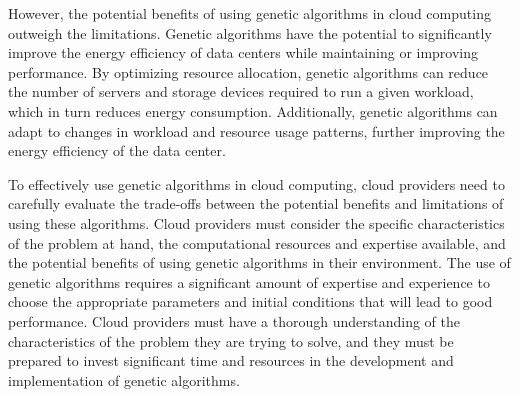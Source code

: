 However, the potential benefits of using genetic algorithms in cloud computing outweigh the limitations. 
Genetic algorithms have the potential to significantly improve the energy efficiency of data centers while maintaining or improving performance. 
By optimizing resource allocation, genetic algorithms can reduce the number of servers and storage devices required to run a given workload, 
which in turn reduces energy consumption. Additionally, genetic algorithms can adapt to changes in workload and resource usage patterns, 
further improving the energy efficiency of the data center.

To effectively use genetic algorithms in cloud computing, cloud providers need to carefully evaluate the trade-offs between the potential benefits and limitations of using these algorithms. 
Cloud providers must consider the specific characteristics of the problem at hand, the computational resources and expertise available, 
and the potential benefits of using genetic algorithms in their environment. 
The use of genetic algorithms requires a significant amount of expertise and experience to choose the appropriate parameters and initial conditions 
that will lead to good performance. Cloud providers must have a thorough understanding of the characteristics of the problem they are trying to solve, 
and they must be prepared to invest significant time and resources in the development and implementation of genetic algorithms.
\newpage